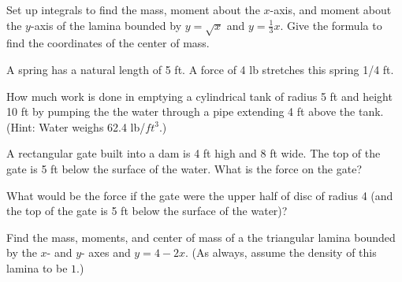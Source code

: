 \documentclass[12pt]{exam}
\begin{document}
\begin{questions}
\question Set up integrals to find the mass, moment about the $x$-axis, and
moment about the $y$-axis of the lamina bounded by $y=\sqrt{x}$ and
$y=\displaystyle \frac{1}{3} x$.  
Give the formula to find the coordinates of the center of mass.
\vspace{.3in}

\question A spring has a natural length of 5 ft.  A force of
4 lb stretches this spring 1/4 ft.  
\vspace{.3in}

\question How much work is done in emptying a cylindrical tank of 
radius 5 ft and height 10 ft by pumping the the water through a 
pipe extending 4 ft above the tank.  (Hint: Water weighs 62.4 lb/$ft^3$.)
\vspace{.3in}

\question A rectangular gate built into a dam is 4 ft high and 8 ft wide.
The top of the gate is 5 ft below the surface of the water.  What is the 
force on the gate?
\vspace{.3in}

\question What would be  the force if the gate were the upper half of disc of
radius 4 (and the top of the gate is 5 ft below the surface of the water)?
\vspace{.3in}

\question Find the mass, moments, and center of mass of a the
triangular lamina bounded by the $x$- and $y$- axes and $y=4-2x$.
(As always, assume the density of this lamina to be $1$.)










\end{questions}
\end{document}
